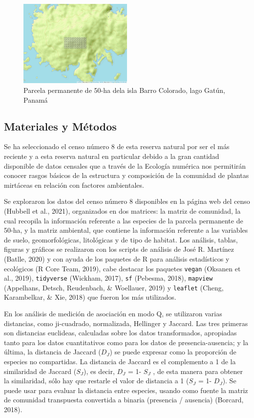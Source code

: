 \documentclass[11pt,]{article}
\begin{document}
\begin{figure}
\centering
\includegraphics[width=0.50000\textwidth]{mapa_cuadros.png}
\caption{Parcela permanente de 50-ha dela isla Barro Colorado, lago
Gatún, Panamá \label{fig:mapa_cuadros_bci}}
\end{figure}

\subsection{Materiales y Métodos}\label{materiales-y-muxe9todos}

Se ha seleccionado el censo número 8 de esta reserva natural por ser el
más reciente y a esta reserva natural en particular debido a la gran
cantidad disponible de datos censales que a través de la Ecología
numérica nos permitirán conocer rasgos básicos de la estructura y
composición de la comunidad de plantas mirtáceas en relación con
factores ambientales.

Se exploraron los datos del censo número 8 disponibles en la página web
del censo (Hubbell et al., 2021), organizados en dos matrices: la matriz
de comunidad, la cual recopila la información referente a las especies
de la parcela permanente de 50-ha, y la matriz ambiental, que contiene
la información referente a las variables de suelo, geomorfológicas,
litológicas y de tipo de habitat. Los análisis, tablas, figuras y
gráficos se realizaron con los scripts de análisis de José R. Martínez
(Batlle, 2020) y con ayuda de los paquetes de R para análisis
estadísticos y ecológicos (R Core Team, 2019), cabe destacar los
paquetes \texttt{vegan} (Oksanen et al., 2019), \texttt{tidyverse}
(Wickham, 2017), \texttt{sf} (Pebesma, 2018), \texttt{mapview}
(Appelhans, Detsch, Reudenbach, \& Woellauer, 2019) y \texttt{leaflet}
(Cheng, Karambelkar, \& Xie, 2018) que fueron los más utilizados.

En los análisis de medición de asociación en modo Q, se utilizaron
varias distancias, como ji-cuadrado, normalizada, Hellinger y Jaccard.
Las tres primeras son distancias euclideas, calculadas sobre los datos
transformados, apropiadas tanto para los datos cuantitativos como para
los datos de presencia-ausencia; y la última, la distancia de Jaccard
(\(D_J\)) se puede expresar como la proporción de especies no
compartidas. La distancia de Jaccard es el complemento a 1 de la
similaridad de Jaccard (\(S_J\)), es decir, \(D_J\) = 1- \(S_J\) , de
esta manera para obtener la similaridad, sólo hay que restarle el valor
de distancia a 1 (\(S_J\) = 1- \(D_J\)). Se puede usar para evaluar la
distancia entre especies, usando como fuente la matriz de comunidad
transpuesta convertida a binaria (presencia / ausencia) (Borcard, 2018).
\end{document}
